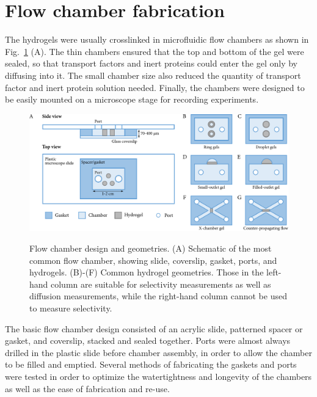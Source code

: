 


\section{Flow chamber fabrication}
\label{sec:flow-chambers}

The hydrogels were usually crosslinked in microfluidic flow chambers as shown in Fig.~\ref{fig:chamber-geometries} (A).  The thin chambers ensured that the top and bottom of the gel were sealed, so that transport factors and inert proteins could enter the gel only by diffusing into it.  The small chamber size also reduced the quantity of transport factor and inert protein solution needed.  Finally, the chambers were designed to be easily mounted on a microscope stage for recording experiments.

\begin{figure}
\caption[Flow chamber design and geometries.]{Flow chamber design and geometries.  (A) Schematic of the most common flow chamber, showing slide, coverslip, gasket, ports, and hydrogels.  (B)-(F) Common hydrogel geometries.  Those in the left-hand column are suitable for selectivity measurements as well as diffusion measurements, while the right-hand column cannot be used to measure selectivity.}
\centering
\includegraphics[width=\textwidth]{figs/ch03/methods-cartoon}
\label{fig:chamber-geometries}
\end{figure}

The basic flow chamber design consisted of an acrylic slide, patterned spacer or gasket, and coverslip, stacked and sealed together.  Ports were almost always drilled in the plastic slide before chamber assembly, in order to allow the chamber to be filled and emptied.  Several methods of fabricating the gaskets and ports were tested in order to optimize the watertightness and longevity of the chambers as well as the ease of fabrication and re-use.

